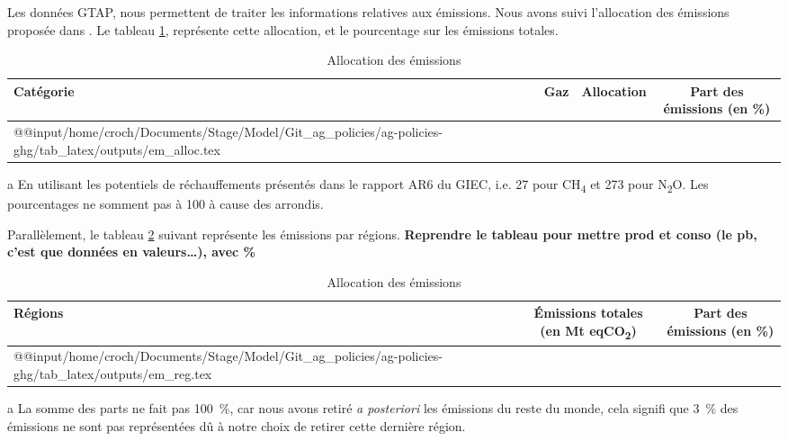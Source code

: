 Les données GTAP, nous permettent de traiter les informations relatives aux émissions. Nous avons suivi l'allocation des émissions proposée dans \cite{Valin2023}. Le tableau \ref{tab:em_allocation}, représente cette allocation, et le pourcentage sur les émissions totales.
\begin{table}[h]
    \centering
    \begin{threeparttable}
        \begin{tabularx}{\textwidth}{p{1.5in}p{1.2in}p{1.2in}c}
            \textbf{Catégorie} & \textbf{Gaz} & \textbf{Allocation} & \textbf{Part des émissions}\tnote{a} (en \%) \\ \hline
            \csname @@input\endcsname /home/croch/Documents/Stage/Model/Git_ag_policies/ag-policies-ghg/tab_latex/outputs/em_alloc.tex
            \hline
        \end{tabularx}
        \begin{tablenotes}
            \footnotesize
            \item[a] En utilisant les potentiels de réchauffements présentés dans le rapport AR6 du GIEC, i.e. 27 pour CH\textsubscript{4} et 273 pour N\textsubscript{2}O. Les pourcentages ne somment pas à 100 à cause des arrondis.
        \end{tablenotes}
        \caption{Allocation des émissions}
        \label{tab:em_allocation}
    \end{threeparttable}
\end{table}

Parallèlement, le tableau \ref{tab:em_reg} suivant représente les émissions par régions. \textbf{Reprendre le tableau pour mettre prod et conso (le pb, c'est que données en valeurs\dots), avec \%}

\begin{table}[h]
    \centering
    \begin{threeparttable}
        \begin{tabularx}{\textwidth}{p{1.9in}cc}
            \textbf{Régions} & \textbf{Émissions totales} (en Mt eqCO\textsubscript{2}) & \textbf{Part des émissions}\tnote{a} (en \%) \\ \hline
            \csname @@input\endcsname /home/croch/Documents/Stage/Model/Git_ag_policies/ag-policies-ghg/tab_latex/outputs/em_reg.tex
            \hline
        \end{tabularx}
        \begin{tablenotes}
            \footnotesize
            \item[a] La somme des parts ne fait pas 100~\%, car nous avons retiré \textit{a posteriori} les émissions du reste du monde, cela signifi que 3~\% des émissions ne sont pas représentées dû à notre choix de retirer cette dernière région.
        \end{tablenotes}
        \caption{Allocation des émissions}
        \label{tab:em_reg}
    \end{threeparttable}
\end{table}

